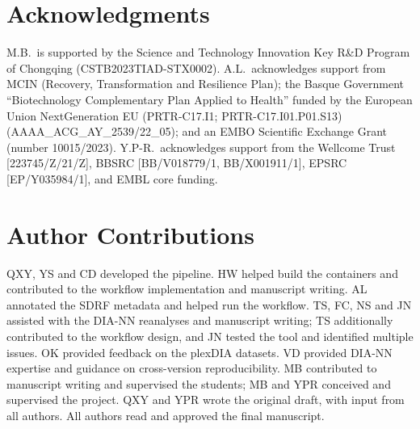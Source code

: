 \section*{Acknowledgments}
M.B.\ is supported by the Science and Technology Innovation Key R\&D Program of Chongqing (CSTB2023TIAD-STX0002). A.L.\ acknowledges support from MCIN (Recovery, Transformation and Resilience Plan); the Basque Government ``Biotechnology Complementary Plan Applied to Health'' funded by the European Union NextGeneration EU (PRTR-C17.I1; PRTR-C17.I01.P01.S13) (AAAA\_ACG\_AY\_2539/22\_05); and an EMBO Scientific Exchange Grant (number 10015/2023). Y.P-R.\ acknowledges support from the Wellcome Trust [223745/Z/21/Z], BBSRC [BB/V018779/1, BB/X001911/1], EPSRC [EP/Y035984/1], and EMBL core funding.

\section*{Author Contributions}
QXY, YS and CD developed the pipeline.
HW helped build the containers and contributed to the workflow implementation and manuscript writing.
AL annotated the SDRF metadata and helped run the workflow.
TS, FC, NS and JN assisted with the DIA-NN reanalyses and manuscript writing; TS additionally contributed to the workflow design, and JN tested the tool and identified multiple issues.
OK provided feedback on the plexDIA datasets.
VD provided DIA-NN expertise and guidance on cross-version reproducibility.
MB contributed to manuscript writing and supervised the students; MB and YPR conceived and supervised the project.
QXY and YPR wrote the original draft, with input from all authors.
All authors read and approved the final manuscript.

